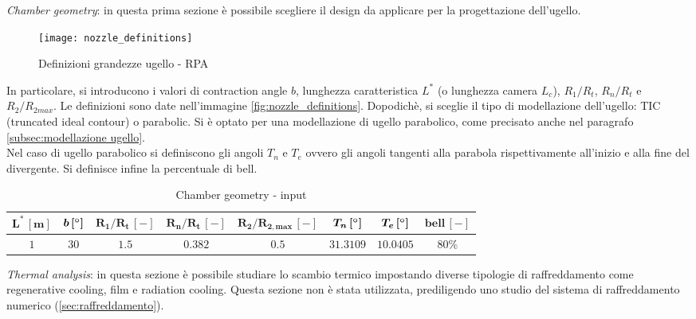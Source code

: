 \begin{itemize}

\parbox[t]{\dimexpr\textwidth-\leftmargin}{%
\item \textit{Chamber geometry}: in questa prima sezione è possibile scegliere il design da applicare per la progettazione dell'ugello.
\begin{wrapfigure}{r}{0.4\linewidth}
	\centering
	\vspace{-\baselineskip}
	\texttt{[image: nozzle\_definitions]}
	\caption{Definizioni grandezze ugello - RPA }
	\label{fig:nozzle_definitions}
\end{wrapfigure}
In particolare, si introducono i valori di contraction angle $b$, lunghezza caratteristica $L^*$ (o lunghezza camera $L_c$), $R_1/R_t$, $R_n/R_t$ e $R_2/R_{2max}$. Le definizioni sono date nell'immagine \autoref{fig:nozzle_definitions}. Dopodichè, si sceglie il tipo di modellazione dell'ugello: TIC (truncated ideal contour) o parabolic. Si è optato per una modellazione di ugello parabolico, come precisato anche nel paragrafo \autoref{subsec:modellazione ugello}. \\
Nel caso di ugello parabolico si definiscono gli angoli $T_n$ e $T_e$ ovvero gli angoli tangenti alla parabola rispettivamente all'inizio e alla fine del divergente. Si definisce infine la percentuale di bell.
\begin{table}[H]
\centering
\begin{tabular}{|c|c|c|c|c|c|c|c|}
\hline
$\bm{L^* \, [m]}$ & $\bm{b \, [\degree]}$ & $\bm{R_1/R_t \, [-]}$ & $\bm{R_n/R_t \, [-]}$ & $\bm{R_2/R_{2,max} \, [-]}$  & $\bm{T_n \, [\degree]}$ &  $\bm{T_e \, [\degree]}$ & $\bm{bell \, [-]}$ \\
\hline
$1$ & $30$ & $1.5$ & $0.382$ & $0.5$ & $31.3109$ & $10.0405$ & $80$\% \\
\hline
\end{tabular}
\caption{Chamber geometry - input}
\label{table:chamb_input}
\end{table}
}

\item \textit{Thermal analysis}: in questa sezione è possibile studiare lo scambio termico impostando diverse tipologie di raffreddamento come regenerative cooling, film e radiation cooling. Questa sezione non è stata utilizzata, prediligendo uno studio del sistema di raffreddamento numerico (\autoref{sec:raffreddamento}).


\end{itemize}
